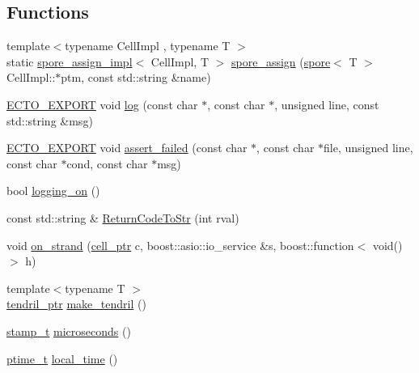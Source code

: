 \subsection*{Functions}
\begin{DoxyCompactItemize}
\item 
{\footnotesize template$<$typename Cell\+Impl , typename T $>$ }\\static \hyperlink{structecto_1_1spore__assign__impl}{spore\+\_\+assign\+\_\+impl}$<$ Cell\+Impl, T $>$ \hyperlink{namespaceecto_a776138cb830340922312c3ec98c15b6d}{spore\+\_\+assign} (\hyperlink{structecto_1_1spore}{spore}$<$ T $>$ Cell\+Impl\+::$\ast$ptm, const std\+::string \&name)
\item 
\hyperlink{util_8hpp_ab55b7868679cda60fc162580957fb98c}{E\+C\+T\+O\+\_\+\+E\+X\+P\+O\+RT} void \hyperlink{namespaceecto_a3870bebbdf6a0d01f28424e402be2834}{log} (const char $\ast$, const char $\ast$, unsigned line, const std\+::string \&msg)
\item 
\hyperlink{util_8hpp_ab55b7868679cda60fc162580957fb98c}{E\+C\+T\+O\+\_\+\+E\+X\+P\+O\+RT} void \hyperlink{namespaceecto_af79493e380ac31e886186e2ba1a1b809}{assert\+\_\+failed} (const char $\ast$, const char $\ast$file, unsigned line, const char $\ast$cond, const char $\ast$msg)
\item 
bool \hyperlink{namespaceecto_a34c1f436c47dc08392c8248632cde6f0}{logging\+\_\+on} ()
\item 
const std\+::string \& \hyperlink{namespaceecto_a00786d16020c07e60fea08e8352dba30}{Return\+Code\+To\+Str} (int rval)
\item 
void \hyperlink{namespaceecto_a653dab75b6cd892233b9f3676a5d2921}{on\+\_\+strand} (\hyperlink{namespaceecto_aed1809e82b9229ea81ef9ee3438cf62c}{cell\+\_\+ptr} c, boost\+::asio\+::io\+\_\+service \&s, boost\+::function$<$ void()$>$ h)
\item 
{\footnotesize template$<$typename T $>$ }\\\hyperlink{namespaceecto_a84fb5f6130275382e5cbeb5fdececa78}{tendril\+\_\+ptr} \hyperlink{namespaceecto_af284ea4dc605a1d2e037731e5f35eeaa}{make\+\_\+tendril} ()
\item 
\hyperlink{namespaceecto_a96ba8fa498cc4b8e2a0217a9e236b50d}{stamp\+\_\+t} \hyperlink{namespaceecto_af5e1929b12d596f7cc45a3fe7c76c5ed}{microseconds} ()
\item 
\hyperlink{namespaceecto_a5bbe8fb0da047cb18d92eb9dfb469652}{ptime\+\_\+t} \hyperlink{namespaceecto_a67829007171203782a69bde851cb1dc6}{local\+\_\+time} ()
\item 

\end{DoxyCompactItemize}
